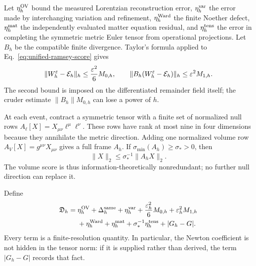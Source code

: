 Let \(\eta_h^{\rm OV}\) bound the measured Lorentzian reconstruction error,
\(\eta_h^{\rm var}\) the error made by interchanging variation and
refinement, \(\eta_h^{\rm Ward}\) the finite Noether defect,
\(\eta_h^{\rm mat}\) the independently evaluated matter equation residual,
and \(\eta_h^{\rm tens}\) the error in completing the symmetric metric Euler
tensor from operational projections.  Let \(B_h\) be the compatible finite
divergence.  Taylor's formula applied to
Eq.~\eqref{eq:unified-ramsey-score} gives
\begin{equation}
 \|W_h^\varepsilon-{\cal E}_h\|_h
 \le\frac{\varepsilon^2}{6}M_{0,h},
 \qquad
 \|B_h(W_h^\varepsilon-{\cal E}_h)\|_h
 \le\varepsilon^2M_{1,h}.
 \label{eq:unified-central-difference}
\end{equation}
The second bound is imposed on the differentiated remainder field itself;
the cruder estimate \(\|B_h\|M_{0,h}\) can lose a power of \(h\).

At each event, contract a symmetric tensor with a finite set of normalized
null rows
\(A_\ell[X]=X_{\mu\nu}\ell^\mu\ell^\nu\).  These rows have rank at most nine
in four dimensions because they annihilate the metric direction.  Adding
one normalized volume row \(A_V[X]=g^{\mu\nu}X_{\mu\nu}\) gives a full frame
\(A_h\).  If
\(\sigma_{\min}(A_h)\ge\sigma_*>0\), then
\begin{equation}
 \|X\|_2\le\sigma_*^{-1}\|A_hX\|_2 .
 \label{eq:unified-frame-bound}
\end{equation}
The volume score is thus information-theoretically nonredundant; no further
null direction can replace it.

Define
\begin{align}
 {\mathfrak D}_h={}&
 \eta_h^{\rm OV}
 +\Delta_h^{\rm same}
 +\eta_h^{\rm var}
 +\frac{\varepsilon_h^2}{6}M_{0,h}
 +\varepsilon_h^2M_{1,h}\nonumber\\
 &+\eta_h^{\rm Ward}
 +\eta_h^{\rm mat}
 +\sigma_*^{-1}\eta_h^{\rm tens}
 +|G_h-G|.
 \label{eq:unified-certificate}
\end{align}
Every term is a finite-resolution quantity.  In particular, the Newton
coefficient is not hidden in the tensor norm: if it is supplied rather than
derived, the term \(|G_h-G|\) records that fact.

